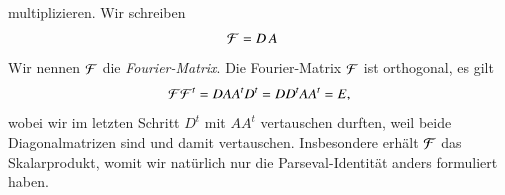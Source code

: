 multiplizieren.
Wir schreiben
\begin{align*}
{\cal F}
&=
D\, A
\end{align*}
Wir nennen $\cal F$ die {\em Fourier-Matrix}.
%
Die Fourier-Matrix $\cal F$ ist orthogonal, es gilt
\[
{\cal F}{\cal F}^t
=
DAA^tD^t
=
DD^tAA^t
=
E,
\]
wobei wir im letzten Schritt $D^t$ mit $AA^t$ vertauschen durften,
weil beide Diagonalmatrizen sind und damit vertauschen.
Insbesondere erhält $\cal F$ das Skalarprodukt, womit wir natürlich
nur die Parseval-Identität anders formuliert haben.




